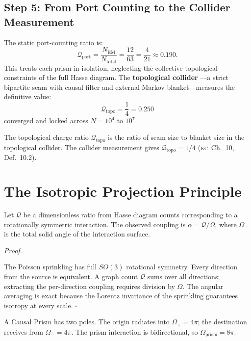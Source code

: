 \documentclass[11pt, a4paper, openany]{book}
\newcommand{\KC}[1]{\textnormal{(\textsc{kc}~#1)}}
\newcounter{thm}[chapter]
\renewenvironment{proof}[1][Proof]{%
  \par\noindent\textit{#1.}\quad
}{\hfill$\square$\par\medskip}
\begin{document}
\subsection{Step 5: From Port Counting to the Collider Measurement}

The static port-counting ratio is:
\[
  \mathcal{Q}_{\mathrm{port}}
  = \frac{N_{\mathrm{EM}}}{N_{\mathrm{total}}}
  = \frac{12}{63} = \frac{4}{21} \approx 0.190.
\]
This treats each prism in isolation, neglecting the collective
topological constraints of the full Hasse diagram. The \textbf{topological collider}
---a strict bipartite seam with causal filter and external Markov
blanket---measures the definitive value:
\[
  \boxed{\;\mathcal{Q}_{\mathrm{topo}} = \frac{1}{4} = 0.250\;}
\]
converged and locked across $N = 10^4$ to $10^7$.

\begin{definition}\label{def:qtopo}
The topological charge ratio $\mathcal{Q}_{\mathrm{topo}}$ is the
ratio of seam size to blanket size in the topological collider.
The collider measurement gives
$\mathcal{Q}_{\mathrm{topo}} = 1/4$
\KC{Ch.~10, Def.~10.2}.
\end{definition}

\section{The Isotropic Projection Principle}\label{sec:projection}

\begin{theorem}\label{thm:projection}
Let $\mathcal{Q}$ be a dimensionless ratio from Hasse diagram counts
corresponding to a rotationally symmetric interaction. The observed
coupling is $\alpha = \mathcal{Q}/\Omega$, where $\Omega$ is the total
solid angle of the interaction surface.
\end{theorem}

\begin{proof}
The Poisson sprinkling has full $SO(3)$ rotational symmetry. Every
direction from the source is equivalent. A graph count $\mathcal{Q}$
sums over all directions; extracting the per-direction coupling requires
division by $\Omega$.  The angular averaging is exact because the
Lorentz invariance of the sprinkling guarantees isotropy at every scale.
\end{proof}

\begin{theorem}[Dual Light Cone: $\Omega = 8\pi$]\label{thm:dual-cone}
A Causal Prism has two poles. The origin radiates into
$\Omega_+ = 4\pi$; the destination receives from $\Omega_- = 4\pi$.
The prism interaction is bidirectional, so
$\Omega_{\mathrm{prism}} = 8\pi$.
\end{theorem}
\end{document}
